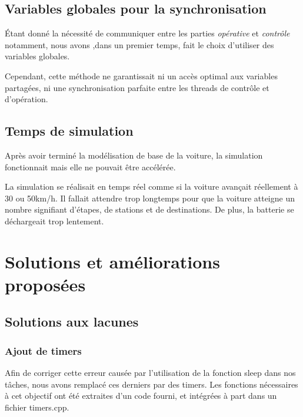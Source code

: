 \documentclass[conference]{IEEEtran}
\begin{document}
\subsection{Variables globales pour la synchronisation}

Étant donné la nécessité de communiquer entre les parties \emph{opérative} et \emph{contrôle} notamment, nous avons ,dans un premier temps, fait le choix d'utiliser des variables globales. 

Cependant, cette méthode ne garantissait ni un accès optimal aux variables partagées, ni une synchronisation parfaite entre les threads de contrôle et d'opération.

\subsection{Temps de simulation}

Après avoir terminé la modélisation de base de la voiture, la simulation fonctionnait mais elle ne pouvait être accélérée.

La simulation se réalisait en temps réel comme si la voiture avançait réellement à 30 ou 50km/h. Il fallait attendre trop longtemps pour que la voiture atteigne un nombre signifiant d'étapes, de stations et de destinations. De plus, la batterie se déchargeait trop lentement.


\section{Solutions et améliorations proposées}
\label{sec:ameliorations}

\subsection{Solutions aux lacunes}

\subsubsection{Ajout de timers}

Afin de corriger cette erreur causée par l'utilisation de la fonction sleep dans nos tâches, nous avons remplacé ces derniers par des timers. Les fonctions nécessaires à cet objectif ont été extraites d'un code fourni, et intégrées à part dans un fichier timers.cpp. 
\end{document}
